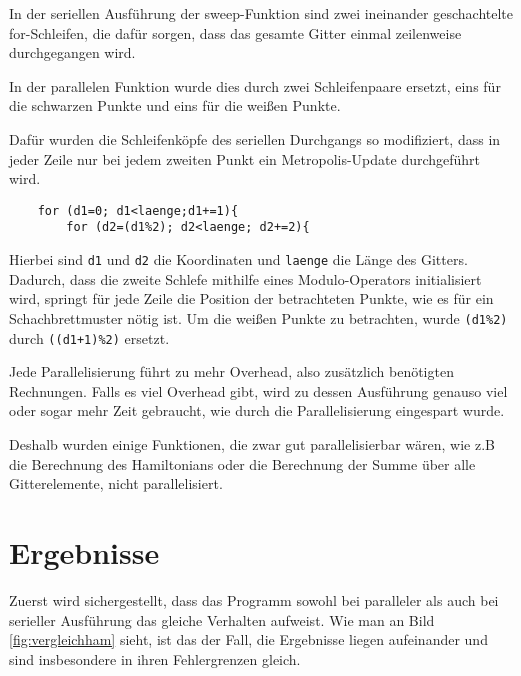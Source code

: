 \documentclass{scrreprt}
\begin{document}
	In der seriellen Ausführung der sweep-Funktion sind zwei ineinander geschachtelte for-Schleifen, die dafür sorgen, dass das gesamte Gitter einmal zeilenweise durchgegangen wird.
	
	In der parallelen Funktion wurde dies durch zwei Schleifenpaare ersetzt, eins für die schwarzen Punkte und eins für die weißen Punkte.
	
	Dafür wurden die Schleifenköpfe des seriellen Durchgangs so modifiziert, dass in jeder Zeile nur bei jedem zweiten Punkt ein Metropolis-Update durchgeführt wird. 
	\begin{verbatim}
	for (d1=0; d1<laenge;d1+=1){
		for (d2=(d1%2); d2<laenge; d2+=2){
	\end{verbatim}
	Hierbei sind \texttt{d1} und \texttt{d2} die Koordinaten und \texttt{laenge} die Länge des Gitters. Dadurch, dass die zweite Schlefe mithilfe eines Modulo-Operators initialisiert wird, springt für jede Zeile die Position der betrachteten Punkte, wie es für ein Schachbrettmuster nötig ist. Um die weißen Punkte zu betrachten, wurde \texttt{(d1\%2)} durch \texttt{((d1+1)\%2)} ersetzt.
	
	Jede Parallelisierung führt zu mehr Overhead, also zusätzlich benötigten Rechnungen. Falls es viel Overhead gibt, wird zu dessen Ausführung genauso viel oder sogar mehr Zeit gebraucht, wie durch die Parallelisierung eingespart wurde.
	
	Deshalb wurden einige Funktionen, die zwar gut parallelisierbar wären, wie z.B die Berechnung des Hamiltonians oder die Berechnung der Summe über alle Gitterelemente, nicht parallelisiert.
	

	

	
	 	
	\chapter{Ergebnisse}
	\label{chap:ergebnisse}
	
	Zuerst wird sichergestellt, dass das Programm sowohl bei paralleler als auch bei serieller Ausführung das gleiche Verhalten aufweist. Wie man an Bild \ref{fig:vergleichham} sieht, ist das der Fall, die Ergebnisse liegen aufeinander und sind insbesondere in ihren Fehlergrenzen gleich.
	
\end{document}
